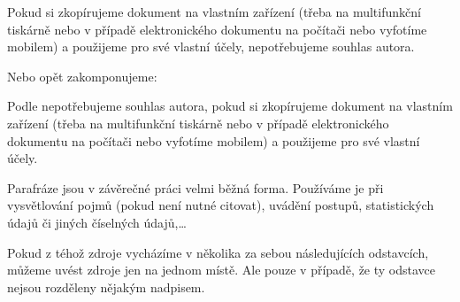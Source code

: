 Pokud si zkopírujeme dokument na vlastním zařízení (třeba na multifunkční tiskárně nebo v případě elektronického dokumentu na počítači nebo vyfotíme mobilem) a použijeme pro své vlastní účely, nepotřebujeme souhlas autora.\cite{autorskepravo}
\bigskip

Nebo opět zakomponujeme:
\bigskip

Podle \cite{autorskepravo} nepotřebujeme souhlas autora, pokud si zkopírujeme dokument na vlastním zařízení (třeba na multifunkční tiskárně nebo v případě elektronického dokumentu na počítači nebo vyfotíme mobilem) a použijeme pro své vlastní účely.
\bigskip


Parafráze jsou v závěrečné práci velmi běžná forma. Používáme je při vysvětlování pojmů (pokud není nutné citovat), uvádění postupů, statistických údajů či jiných číselných údajů,\dots

Pokud z téhož zdroje vycházíme v několika za sebou následujících odstavcích, můžeme uvést zdroje jen na jednom místě. Ale pouze v případě, že ty odstavce nejsou rozděleny nějakým nadpisem.




